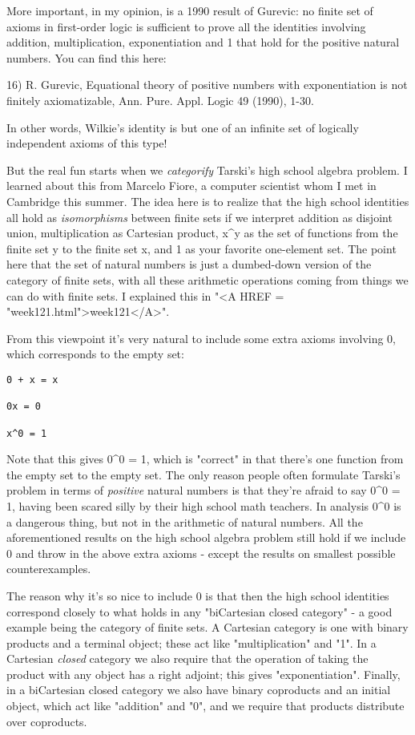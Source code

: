 More important, in my opinion, is a 1990 result of Gurevic: no finite
set of axioms in first-order logic is sufficient to prove all the 
identities involving addition, multiplication, exponentiation and 1 
that hold for the positive natural numbers.  You can find this here:

16) R. Gurevic, Equational theory of positive numbers with exponentiation
is not finitely axiomatizable, Ann. Pure. Appl. Logic 49 (1990), 1-30.

In other words, Wilkie's identity is but one of an infinite set of
logically independent axioms of this type!

But the real fun starts when we \emph{categorify} Tarski's high school
algebra problem.  I learned about this from Marcelo Fiore, a computer
scientist whom I met in Cambridge this summer.  The idea here is to
realize that the high school identities all hold as
\emph{isomorphisms} between finite sets if we interpret addition as
disjoint union, multiplication as Cartesian product, x^y as the set of
functions from the finite set y to the finite set x, and 1 as your
favorite one-element set.  The point here that the set of natural
numbers is just a dumbed-down version of the category of finite sets,
with all these arithmetic operations coming from things we can do with
finite sets.  I explained this in "<A HREF =
"week121.html">week121</A>".

From this viewpoint it's very natural to include some extra axioms
involving 0, which corresponds to the empty set: 

\begin{verbatim}
0 + x = x        

0x = 0     

x^0 = 1
\end{verbatim}
    
Note that this gives 0^0 = 1, which is "correct" in that there's one
function from the empty set to the empty set.  The only reason people
often formulate Tarski's problem in terms of \emph{positive} natural numbers
is that they're afraid to say 0^0 = 1, having been scared silly by their
high school math teachers.  In analysis 0^0 is a dangerous thing, but
not in the arithmetic of natural numbers.  All the aforementioned
results on the high school algebra problem still hold if we include 0
and throw in the above extra axioms - except the results on smallest
possible counterexamples.

The reason why it's so nice to include 0 is that then the high school
identities correspond closely to what holds in any "biCartesian
closed category" - a good example being the category of finite
sets.  A Cartesian category is one with binary products and a terminal
object; these act like "multiplication" and "1".  In
a Cartesian \emph{closed} category we also require that the operation
of taking the product with any object has a right adjoint; this gives
"exponentiation".  Finally, in a biCartesian closed category
we also have binary coproducts and an initial object, which act like
"addition" and "0", and we require that products
distribute over coproducts.

